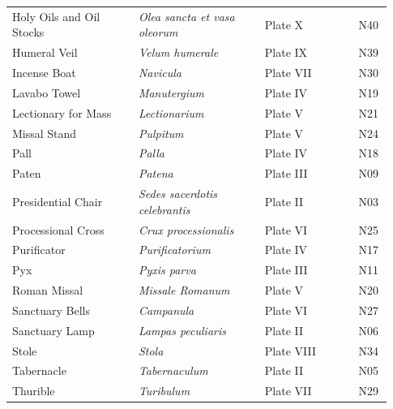 {\begin{longtable}{>{\raggedright\arraybackslash}p{0.31\linewidth}>{\raggedright\arraybackslash}p{0.31\linewidth}>{\raggedright\arraybackslash}p{0.23\linewidth}>{\raggedright\arraybackslash}p{0.08\linewidth}}
Holy Oils and Oil Stocks & \textit{Olea sancta et vasa oleorum} & Plate X & N40 \\
Humeral Veil & \textit{Velum humerale} & Plate IX & N39 \\
Incense Boat & \textit{Navicula} & Plate VII & N30 \\
Lavabo Towel & \textit{Manutergium} & Plate IV & N19 \\
Lectionary for Mass & \textit{Lectionarium} & Plate V & N21 \\
Missal Stand & \textit{Pulpitum} & Plate V & N24 \\
Pall & \textit{Palla} & Plate IV & N18 \\
Paten & \textit{Patena} & Plate III & N09 \\
Presidential Chair & \textit{Sedes sacerdotis celebrantis} & Plate II & N03 \\
Processional Cross & \textit{Crux processionalis} & Plate VI & N25 \\
Purificator & \textit{Purificatorium} & Plate IV & N17 \\
Pyx & \textit{Pyxis parva} & Plate III & N11 \\
Roman Missal & \textit{Missale Romanum} & Plate V & N20 \\
Sanctuary Bells & \textit{Campanula} & Plate VI & N27 \\
Sanctuary Lamp & \textit{Lampas peculiaris} & Plate II & N06 \\
Stole & \textit{Stola} & Plate VIII & N34 \\
Tabernacle & \textit{Tabernaculum} & Plate II & N05 \\
Thurible & \textit{Turibulum} & Plate VII & N29 \\
\bottomrule
\end{longtable}}

